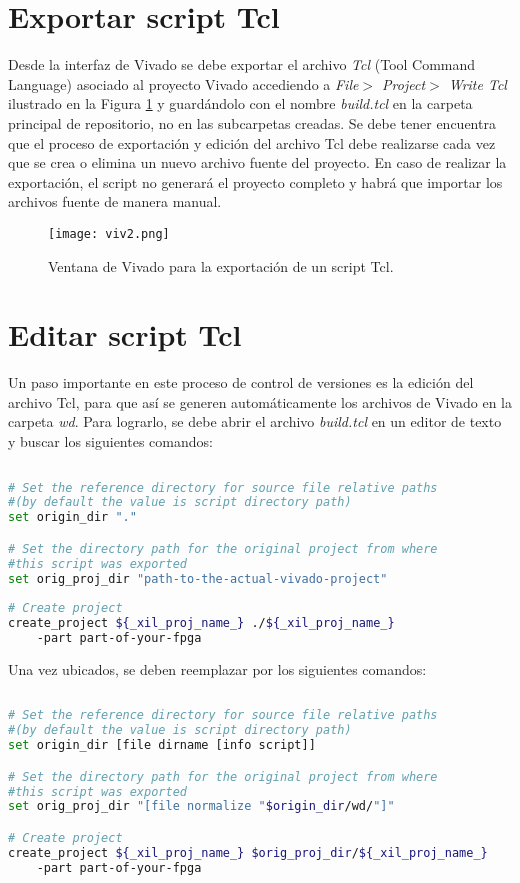 \section{Exportar script Tcl}

	Desde la interfaz de Vivado se debe exportar el archivo \textit{Tcl} (Tool Command Language) asociado al proyecto Vivado accediendo a \textit{File$>$ Project$>$ Write Tcl} ilustrado en la Figura \ref{fig:viv2} y guardándolo con el nombre \textit{build.tcl} en la carpeta principal de repositorio, no en las subcarpetas creadas. Se debe tener encuentra que el proceso de exportación y edición del archivo Tcl debe realizarse cada vez que se crea o elimina un nuevo archivo fuente del proyecto. En caso de realizar la exportación, el script no generará el proyecto completo y habrá que importar los archivos fuente de manera manual.
	
	\begin{figure}[ht]
		\centering
		\texttt{[image: viv2.png]}
		\caption{Ventana de Vivado para la exportación de un script Tcl.}
		\label{fig:viv2}
	\end{figure}

\section{Editar script Tcl}
	Un paso importante en este proceso de control de versiones es la edición del archivo Tcl, para que así se generen automáticamente los archivos de Vivado en la carpeta \textit{wd}. Para lograrlo, se debe abrir el archivo \textit{build.tcl} en un editor de texto y buscar los siguientes comandos:

\begin{lstlisting}[language=bash, frame=single, basicstyle=\small]
	
# Set the reference directory for source file relative paths 
#(by default the value is script directory path)
set origin_dir "."

# Set the directory path for the original project from where
#this script was exported
set orig_proj_dir "path-to-the-actual-vivado-project"
	
# Create project
create_project ${_xil_proj_name_} ./${_xil_proj_name_} 
	-part part-of-your-fpga

\end{lstlisting}

	Una vez ubicados, se deben reemplazar por los siguientes comandos:
	
\begin{lstlisting}[language=bash, frame=single, basicstyle=\small]
	
# Set the reference directory for source file relative paths 
#(by default the value is script directory path)
set origin_dir [file dirname [info script]]

# Set the directory path for the original project from where 
#this script was exported
set orig_proj_dir "[file normalize "$origin_dir/wd/"]"

# Create project
create_project ${_xil_proj_name_} $orig_proj_dir/${_xil_proj_name_} 
	-part part-of-your-fpga

\end{lstlisting}


